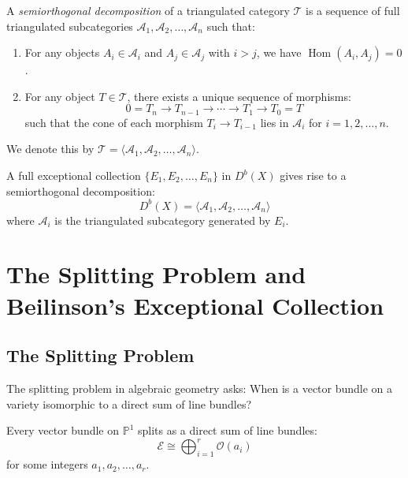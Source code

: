 \documentclass[12pt]{article}
\begin{document}
\begin{definition}
    A \textit{semiorthogonal decomposition} of a triangulated category $\mathcal{T}$ is a sequence of full triangulated subcategories $\mathcal{A}_1, \mathcal{A}_2, \ldots, \mathcal{A}_n$ such that:
    \begin{enumerate}
        \item For any objects $A_i \in \mathcal{A}_i$ and $A_j \in \mathcal{A}_j$ with $i > j$, we have $\operatorname{Hom}(A_i, A_j) = 0$.
        \item For any object $T \in \mathcal{T}$, there exists a unique sequence of morphisms:
              \[
                  0 = T_n \to T_{n-1} \to \cdots \to T_1 \to T_0 = T
              \]
              such that the cone of each morphism $T_i \to T_{i-1}$ lies in $\mathcal{A}_i$ for $i=1,2,\ldots,n$.
    \end{enumerate}
    We denote this by $\mathcal{T} = \langle \mathcal{A}_1, \mathcal{A}_2, \ldots, \mathcal{A}_n \rangle$.
\end{definition}

\begin{proposition}
    A full exceptional collection $\{E_1, E_2, \ldots, E_n\}$ in $D^b(X)$ gives rise to a semiorthogonal decomposition:
    \[
        D^b(X) = \langle \mathcal{A}_1, \mathcal{A}_2, \ldots, \mathcal{A}_n \rangle
    \]
    where $\mathcal{A}_i$ is the triangulated subcategory generated by $E_i$.
\end{proposition}

\section{The Splitting Problem and Beilinson's Exceptional Collection}

\subsection{The Splitting Problem}

The splitting problem in algebraic geometry asks: When is a vector bundle on a variety isomorphic to a direct sum of line bundles?

\begin{theorem}[Grothendieck]
    Every vector bundle on $\mathbb{P}^1$ splits as a direct sum of line bundles:
    \[
        \mathcal{E} \cong \bigoplus_{i=1}^r \mathcal{O}(a_i)
    \]
    for some integers $a_1, a_2, \ldots, a_r$.
\end{theorem}
\end{document}

